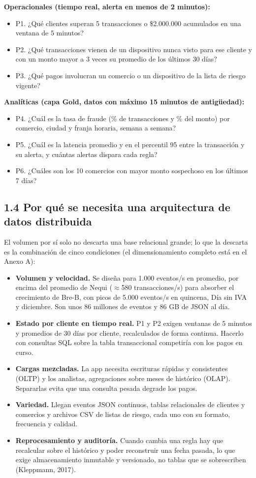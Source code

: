 \documentclass[12pt,letterpaper]{article}
\begin{document}
\textbf{Operacionales (tiempo real, alerta en menos de 2 minutos):}
\begin{itemize}
  \item P1. ¿Qué clientes superan 5 transacciones o \$2.000.000 acumulados en una ventana de 5 minutos?
  \item P2. ¿Qué transacciones vienen de un dispositivo nunca visto para ese cliente y con un monto mayor a 3 veces su promedio de los últimos 30 días?
  \item P3. ¿Qué pagos involucran un comercio o un dispositivo de la lista de riesgo vigente?
\end{itemize}
\textbf{Analíticas (capa Gold, datos con máximo 15 minutos de antigüedad):}
\begin{itemize}
  \item P4. ¿Cuál es la tasa de fraude (\% de transacciones y \% del monto) por comercio, ciudad y franja horaria, semana a semana?
  \item P5. ¿Cuál es la latencia promedio y en el percentil 95 entre la transacción y su alerta, y cuántas alertas dispara cada regla?
  \item P6. ¿Cuáles son los 10 comercios con mayor monto sospechoso en los últimos 7 días?
\end{itemize}

\subsection*{1.4 Por qué se necesita una arquitectura de datos distribuida}

El volumen por sí solo no descarta una base relacional grande; lo que la descarta es la combinación de cinco condiciones (el dimensionamiento completo está en el Anexo A):
\begin{itemize}
  \item \textbf{Volumen y velocidad.} Se diseña para 1.000 eventos/s en promedio, por encima del promedio de Nequi ($\approx$580 transacciones/s) para absorber el crecimiento de Bre-B, con picos de 5.000 eventos/s en quincena, Día sin IVA y diciembre. Son unos 86 millones de eventos y 86 GB de JSON al día.
  \item \textbf{Estado por cliente en tiempo real.} P1 y P2 exigen ventanas de 5 minutos y promedios de 30 días por cliente, recalculados de forma continua. Hacerlo con consultas SQL sobre la tabla transaccional competiría con los pagos en curso.
  \item \textbf{Cargas mezcladas.} La app necesita escrituras rápidas y consistentes (OLTP) y los analistas, agregaciones sobre meses de histórico (OLAP). Separarlas evita que una consulta pesada degrade los pagos.
  \item \textbf{Variedad.} Llegan eventos JSON continuos, tablas relacionales de clientes y comercios y archivos CSV de listas de riesgo, cada uno con su formato, frecuencia y calidad.
  \item \textbf{Reprocesamiento y auditoría.} Cuando cambia una regla hay que recalcular sobre el histórico y poder reconstruir una fecha pasada, lo que exige almacenamiento inmutable y versionado, no tablas que se sobrescriben (Kleppmann, 2017).
\end{itemize}
\end{document}

